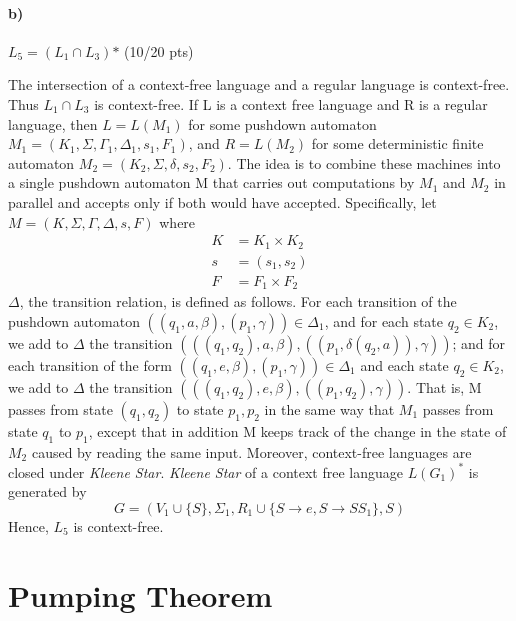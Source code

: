 \documentclass[a4paper,12pt]{article}
\begin{document}
\paragraph{b)} $L_5 = (L_1 \cap L_3)\text{*}$ \hfill \small{(10/20 pts)} \\

\begin{tcolorbox}
The intersection of a context-free language and a regular language is context-free. Thus $L_1\cap L_3$ is context-free. If L is a context free language and R is a regular language, then $L = L(M_1)$ for some pushdown automaton $M_1=(K_1,\Sigma, \Gamma_1, \Delta_1, s_1, F_1)$, and $R = L(M_2)$ for some deterministic finite automaton $M_2=(K_2,\Sigma,\delta,s_2,F_2)$. The idea is to combine these machines into a single pushdown automaton M that carries out computations by $M_1$ and $M_2$ in parallel and accepts only if both would have accepted. Specifically, let $M=(K,\Sigma,\Gamma, \Delta,s,F)$ where
\begin{align*}
    K &= K_1\times K_2\\
s&=(s_1,s_2)\\
F&=F_1\times F_2
\end{align*}
$\Delta$, the transition relation, is defined as follows. For each transition of the pushdown automaton $((q_1,a,\beta),(p_1,\gamma))\in \Delta_1$, and for each state $q_2\in K_2$, we add to $\Delta$ the transition $(((q_1,q_2),a,\beta),((p_1,\delta(q_2,a)),\gamma))$; and for each transition of the form $((q_1,e,\beta),(p_1,\gamma))\in\Delta_1$ and each state $q_2\in K_2$, we add to $\Delta$ the transition $(((q_1,q_2),e,\beta),((p_1,q_2),\gamma))$. That is, M passes from state $(q_1,q_2)$ to state $p_1,p_2$ in the same way that $M_1$ passes from state $q_1$ to $p_1$, except that in addition M keeps track of the change in the state of $M_2$ caused by reading the same input.
Moreover, context-free languages are closed under \textit{Kleene Star}. \textit{Kleene Star} of a context free language $L(G_1)^*$ is generated by
\[
G=(V_1 \cup \{S\}, \Sigma_1, R_1\cup \{S\rightarrow e, S\rightarrow SS_1\},S)
\]
Hence, $L_5$ is context-free.
\end{tcolorbox}





\newpage
\section{Pumping Theorem \hfill {}}
\end{document}
